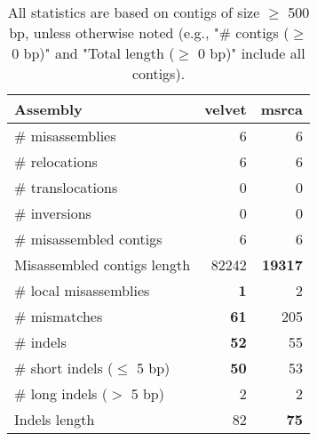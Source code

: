 \documentclass[12pt,a4paper]{article}
\begin{document}
\begin{table}[ht]
\begin{center}
\caption{All statistics are based on contigs of size $\geq$ 500 bp, unless otherwise noted (e.g., "\# contigs ($\geq$ 0 bp)" and "Total length ($\geq$ 0 bp)" include all contigs).}
\begin{tabular}{|l*{2}{|r}|}
\hline
Assembly & velvet & msrca \\ \hline
\# misassemblies & 6 & 6 \\ \hline
\hspace{5mm}\# relocations & 6 & 6 \\ \hline
\hspace{5mm}\# translocations & 0 & 0 \\ \hline
\hspace{5mm}\# inversions & 0 & 0 \\ \hline
\# misassembled contigs & 6 & 6 \\ \hline
Misassembled contigs length & 82242 & {\bf 19317} \\ \hline
\# local misassemblies & {\bf 1} & 2 \\ \hline
\# mismatches & {\bf 61} & 205 \\ \hline
\# indels & {\bf 52} & 55 \\ \hline
\hspace{5mm}\# short indels ($\leq$ 5 bp) & {\bf 50} & 53 \\ \hline
\hspace{5mm}\# long indels ($>$ 5 bp) & 2 & 2 \\ \hline
Indels length & 82 & {\bf 75} \\ \hline
\end{tabular}
\end{center}
\end{table}
\end{document}
